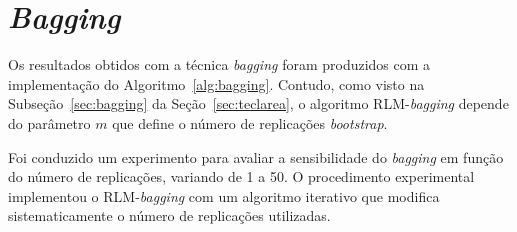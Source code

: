 \section{\textit{Bagging}}
\label{sec:bagging2}
Os resultados obtidos com a técnica \textit{bagging} foram produzidos com a implementação do Algoritmo~\ref{alg:bagging}. Contudo, como visto na Subseção~\ref{sec:bagging} da Seção~\ref{sec:teclarea}, o algoritmo RLM-\textit{bagging} depende do parâmetro $m$ que define o número de replicações \textit{bootstrap}.

Foi conduzido um experimento para avaliar a sensibilidade do \textit{bagging} em função do número de replicações, variando de 1 a 50. O procedimento experimental implementou o RLM-\textit{bagging} com um algoritmo iterativo que modifica sistematicamente o número de replicações utilizadas.

